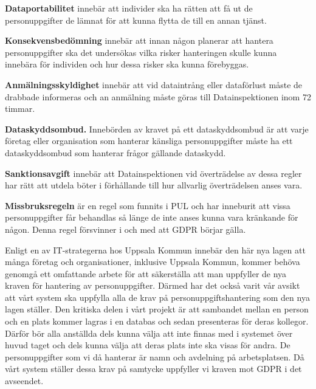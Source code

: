 \documentclass[swedish, a4paper,12pt]{article}
\begin{document}
\textbf{Dataportabilitet} innebär att individer ska ha rätten att få ut de personuppgifter de lämnat för att kunna flytta de till en annan tjänst.

\textbf{Konsekvensbedömning} innebär att innan någon planerar att hantera personuppgifter ska det undersökas vilka risker hanteringen skulle kunna innebära för individen och hur dessa risker ska kunna förebyggas.

\textbf{Anmälningsskyldighet} innebär att vid dataintrång eller dataförlust måste de drabbade informeras och an anmälning måste göras till Datainspektionen inom 72 timmar.

\textbf{Dataskyddsombud.} Innebörden av kravet på ett dataskyddsombud är att varje företag eller organisation som hanterar känsliga personuppgifter måste ha ett dataskyddsombud som hanterar frågor gällande dataskydd.

\textbf{Sanktionsavgift} innebär att Datainspektionen vid överträdelse av dessa regler har rätt att utdela böter i förhållande till hur allvarlig överträdelsen anses vara.

\textbf{Missbruksregeln} är en regel som funnits i PUL och har inneburit att vissa personuppgifter får behandlas så länge de inte anses kunna vara kränkande för någon. Denna regel försvinner i och med att GDPR börjar gälla.

Enligt en av IT-strategerna hos Uppsala Kommun innebär den här nya lagen att många företag och organisationer, inklusive Uppsala Kommun, kommer behöva genomgå ett omfattande arbete för att säkerställa att man uppfyller de nya kraven för hantering av personuppgifter. Därmed har det också varit vår avsikt att vårt system ska uppfylla alla de krav på personuppgiftshantering som den nya lagen ställer. Den kritiska delen i vårt projekt är att sambandet mellan en person och en plats kommer lagras i en databas och sedan presenteras för deras kollegor. Därför bör alla anställda dels kunna välja att inte finnas med i systemet över huvud taget och dels kunna välja att deras plats inte ska visas för andra. De personuppgifter som vi då hanterar är namn och avdelning på arbetsplatsen. Då vårt system ställer dessa krav på samtycke uppfyller vi kraven mot GDPR i det avseendet.
\newpage
\end{document}
